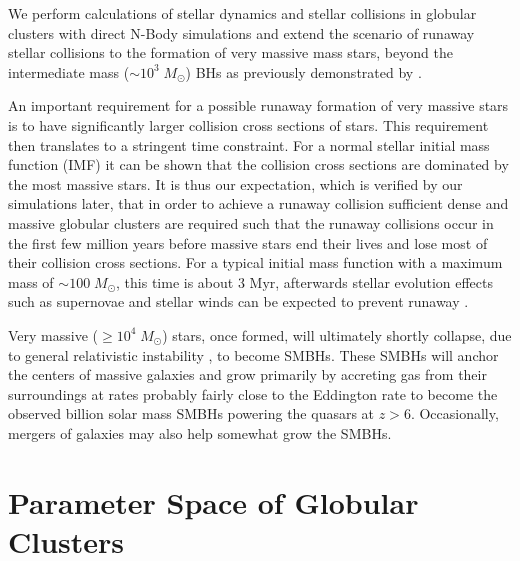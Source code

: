 \documentclass[preprint1]{aastex}
\newcommand\Msun{\; M_\odot}
\newcommand\msun{\; M_\odot}
\newcommand\Myr{\mbox{ Myr}}
\numberwithin{equation}{section}
\begin{document}
We perform calculations of stellar dynamics and stellar collisions in globular clusters with direct N-Body simulations 
and extend the scenario of runaway stellar collisions to 
the formation of very massive mass stars, beyond the intermediate mass ($\sim 10^3\msun$) BHs 
as previously demonstrated by \citet{2004SPZ}.

An important requirement for a possible runaway formation of very massive stars
is to have significantly larger collision cross sections of stars.
This requirement then translates to 
a stringent time constraint.
For a normal stellar initial mass function (IMF)
it can be shown that the collision cross sections are dominated by the most massive stars.
It is thus our expectation, which is verified by our simulations later,
that in order to achieve a runaway collision sufficient dense and massive globular clusters
are required such that the runaway collisions occur in the first few million years before
massive stars end their lives and lose most of their collision cross sections.
For a typical initial mass function with a maximum mass of $\sim100 \Msun$, this time is about $3 \Myr$, 
afterwards stellar evolution effects such as supernovae and stellar winds can be expected to prevent runaway \citep{2002SPZ}. 

Very massive ($\ge 10^4\msun$) stars, once formed,
will ultimately shortly collapse, due to general relativistic instability \citep{1964Chandrasekhar},
to become SMBHs.
These SMBHs will anchor the centers of massive galaxies 
and grow primarily by accreting gas from their surroundings at rates probably fairly close to the Eddington rate
to become the observed billion solar mass SMBHs powering the quasars at $z>6$.
Occasionally, mergers of galaxies may also help somewhat grow the SMBHs.




\section{Parameter Space of Globular Clusters}
\label{Model}
\end{document}
